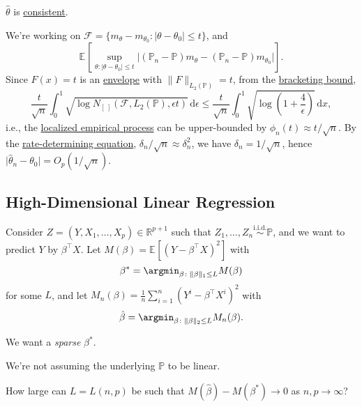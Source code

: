 \begin{note}
	\(\hat{\theta} \) is \hyperref[def:consistent]{consistent}.
\end{note}

We're working on \(\mathscr{F} = \{ m_\theta - m_{\theta _0} \colon \vert \theta - \theta _0 \vert \leq t \} \), and
\[
	\mathbb{E}_{}\left[\sup _{\theta \colon \vert \theta - \theta _0 \vert \leq t} \vert (\mathbb{P} _n - \mathbb{P} ) m_\theta - (\mathbb{P} _n - \mathbb{P} ) m_{\theta _0} \vert \right].
\]
Since \(F(x) = t\) is an \hyperref[def:envelope]{envelope} with \(\lVert F \rVert _{L_2(\mathbb{P} )} = t\), from the \hyperref[thm:bracketing-bound]{bracketing bound},
\[
	\frac{t}{\sqrt{n} } \int_{0}^{1} \sqrt{\log N_{[\ ]}(\mathscr{F} , L_2(\mathbb{P} ), \epsilon t)}  \,\mathrm{d}\epsilon
	\leq \frac{t}{\sqrt{n} } \int_{0}^{1} \sqrt{\log \left( 1 + \frac{4}{\epsilon } \right) } \,\mathrm{d}x ,
\]
i.e., the \hyperref[def:localized-EP]{localized empirical process} can be upper-bounded by \(\phi _n(t) \approx t / \sqrt{n} \). By the \hyperref[def:rate-determining-equation]{rate-determining equation}, \(\delta _n / \sqrt{n} \approx \delta _n^2\), we have \(\delta _n = 1 / \sqrt{n} \), hence \(\vert \hat{\theta} _n - \theta _0 \vert = O_p(1 / \sqrt{n} )\).

\subsection{High-Dimensional Linear Regression}
Consider \(Z = (Y, X_1, \dots , X_p) \in \mathbb{R} ^{p + 1}\) such that \(Z_1, \dots , Z_n \overset{\text{i.i.d.} }{\sim } \mathbb{P} \), and we want to predict \(Y\) by \(\beta ^{\top} X\). Let \(M(\beta ) = \mathbb{E}_{}\left[(Y - \beta ^{\top} X) ^2 \right] \) with
\[
	\beta ^{\ast} = \argmin_{\beta \colon \lVert \beta \rVert _1 \leq L}  M(\beta )
\]
for some \(L\), and let \(M_n(\beta ) = \frac{1}{n} \sum_{i=1}^{n} (Y^i - \beta ^{\top} X^i)^2\) with
\[
	\hat{\beta} = \argmin_{\beta \colon \lVert \beta  \rVert _2 \leq L} M_n(\beta ).
\]

\begin{intuition}
	We want a \emph{sparse} \(\beta ^{\ast} \).
\end{intuition}

\begin{note}
	We're not assuming the underlying \(\mathbb{P} \) to be linear.
\end{note}

\begin{problem*}[Persistency]
	How large can \(L = L(n, p)\) be such that \(M(\hat{\beta} ) - M(\beta ^{\ast} ) \to 0\) as \(n, p \to \infty \)?
\end{problem*}

